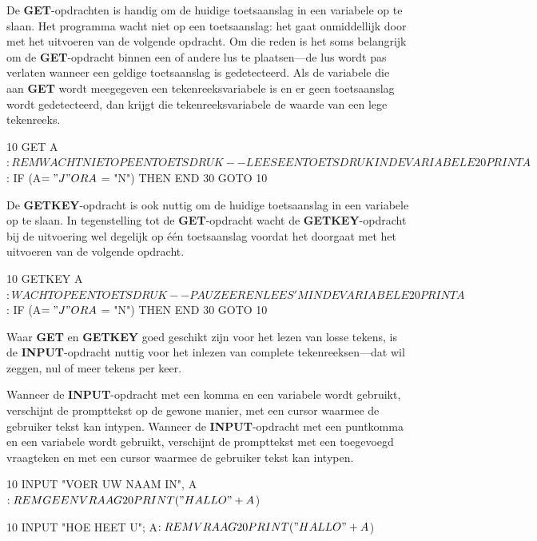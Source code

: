 De {\bf GET}-opdrachten is handig om de huidige toetsaanslag in een variabele op te slaan. Het programma wacht niet op een toetsaanslag: het gaat onmiddellijk door met het uitvoeren van de volgende opdracht. Om die reden is het soms belangrijk om de {\bf GET}-opdracht binnen een of andere lus te plaatsen---de lus wordt pas verlaten wanneer een geldige toetsaanslag is gedetecteerd. Als de variabele die aan {\bf GET} wordt meegegeven een tekenreeksvariabele is en er geen toetsaanslag wordt gedetecteerd, dan krijgt die tekenreeksvariabele de waarde van een lege tekenreeks.

\begin{screencode}
10 GET A$: REM WACHT NIET OP EEN TOETSDRUK--LEES EEN TOETSDRUK IN DE VARIABELE
20 PRINT A$: IF (A$ = "J" OR A$ = "N") THEN END
30 GOTO 10
\end{screencode}

De {\bf GETKEY}-opdracht is ook nuttig om de huidige toetsaanslag in een variabele op te slaan. In tegenstelling tot de {\bf GET}-opdracht wacht de {\bf GETKEY}-opdracht bij de uitvoering wel degelijk op één toetsaanslag voordat het doorgaat met het uitvoeren van de volgende opdracht.

\begin{screencode}
10 GETKEY A$: WACHT OP EEN TOETSDRUK--PAUZEER EN LEES 'M IN DE VARIABELE
20 PRINT A$: IF (A$ = "J" OR A$ = "N") THEN END
30 GOTO 10
\end{screencode}

Waar {\bf GET} en {\bf GETKEY} goed geschikt zijn voor het lezen van losse tekens, is de {\bf INPUT}-opdracht nuttig voor het inlezen van complete tekenreeksen---dat wil zeggen, nul of meer tekens per keer.

Wanneer de {\bf INPUT}-opdracht met een komma en een variabele wordt gebruikt, verschijnt de prompttekst op de gewone manier, met een cursor waarmee de gebruiker tekst kan intypen. Wanneer de {\bf INPUT}-opdracht met een puntkomma en een variabele wordt gebruikt, verschijnt de prompttekst met een toegevoegd vraagteken en met een cursor waarmee de gebruiker tekst kan intypen.

\begin{screencode}
10 INPUT "VOER UW NAAM IN", A$: REM GEEN VRAAG
20 PRINT ("HALLO " + A$)
\end{screencode}

\begin{screencode}
10 INPUT "HOE HEET U"; A$: REM VRAAG
20 PRINT ("HALLO " + A$)
\end{screencode}

